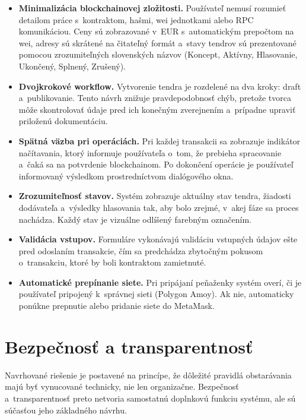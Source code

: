 \begin{itemize}
    \item \textbf{Minimalizácia blockchainovej zložitosti.} Používateľ
    nemusí rozumieť detailom práce s~kontraktom, hašmi, wei jednotkami
    alebo RPC komunikáciou. Ceny sú zobrazované v~EUR s~automatickým
    prepočtom na wei, adresy sú skrátené na čitateľný formát a~stavy
    tendrov sú prezentované pomocou zrozumiteľných slovenských názvov
    (Koncept, Aktívny, Hlasovanie, Ukončený, Splnený, Zrušený).

    \item \textbf{Dvojkrokové workflow.} Vytvorenie tendra je rozdelené
    na dva kroky: draft a~publikovanie. Tento návrh znižuje
    pravdepodobnosť chýb, pretože tvorca môže skontrolovať údaje pred
    ich konečným zverejnením a~prípadne upraviť priloženú dokumentáciu.

    \item \textbf{Spätná väzba pri operáciách.} Pri každej transakcii
    sa zobrazuje indikátor načítavania, ktorý informuje používateľa
    o~tom, že prebieha spracovanie a~čaká sa na potvrdenie blockchainom.
    Po dokončení operácie je používateľ informovaný výsledkom
    prostredníctvom dialógového okna.

    \item \textbf{Zrozumiteľnosť stavov.} Systém zobrazuje aktuálny stav
    tendra, žiadosti dodávateľa a~výsledky hlasovania tak, aby bolo
    zrejmé, v~akej fáze sa proces nachádza. Každý stav je vizuálne
    odlíšený farebným označením.

    \item \textbf{Validácia vstupov.} Formuláre vykonávajú validáciu
    vstupných údajov ešte pred odoslaním transakcie, čím sa predchádza
    zbytočným pokusom o~transakciu, ktoré by boli kontraktom zamietnuté.

    \item \textbf{Automatické prepínanie siete.} Pri pripájaní peňaženky
    systém overí, či je používateľ pripojený k~správnej sieti (Polygon
    Amoy). Ak nie, automaticky ponúkne prepnutie alebo pridanie siete
    do MetaMask.
\end{itemize}

\section{Bezpečnosť a transparentnosť}
\label{sec:security}

Navrhované riešenie je postavené na princípe, že dôležité pravidlá
obstarávania majú byť vynucované technicky, nie len organizačne.
Bezpečnosť a~transparentnosť preto netvoria samostatnú doplnkovú
funkciu systému, ale sú súčasťou jeho základného návrhu.


